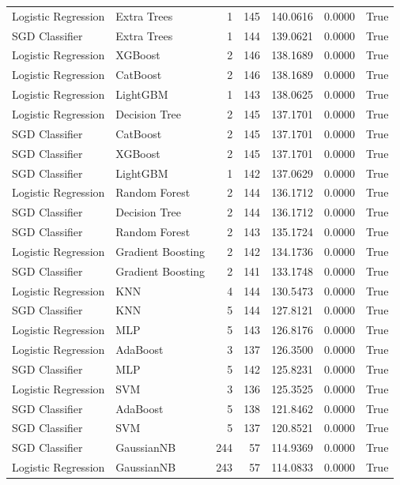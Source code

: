 \begin{table}
\begin{tabular}{llrrrrr}
Logistic Regression & Extra Trees & 1 & 145 & 140.0616 & 0.0000 & True \\
SGD Classifier & Extra Trees & 1 & 144 & 139.0621 & 0.0000 & True \\
Logistic Regression & XGBoost & 2 & 146 & 138.1689 & 0.0000 & True \\
Logistic Regression & CatBoost & 2 & 146 & 138.1689 & 0.0000 & True \\
Logistic Regression & LightGBM & 1 & 143 & 138.0625 & 0.0000 & True \\
Logistic Regression & Decision Tree & 2 & 145 & 137.1701 & 0.0000 & True \\
SGD Classifier & CatBoost & 2 & 145 & 137.1701 & 0.0000 & True \\
SGD Classifier & XGBoost & 2 & 145 & 137.1701 & 0.0000 & True \\
SGD Classifier & LightGBM & 1 & 142 & 137.0629 & 0.0000 & True \\
Logistic Regression & Random Forest & 2 & 144 & 136.1712 & 0.0000 & True \\
SGD Classifier & Decision Tree & 2 & 144 & 136.1712 & 0.0000 & True \\
SGD Classifier & Random Forest & 2 & 143 & 135.1724 & 0.0000 & True \\
Logistic Regression & Gradient Boosting & 2 & 142 & 134.1736 & 0.0000 & True \\
SGD Classifier & Gradient Boosting & 2 & 141 & 133.1748 & 0.0000 & True \\
Logistic Regression & KNN & 4 & 144 & 130.5473 & 0.0000 & True \\
SGD Classifier & KNN & 5 & 144 & 127.8121 & 0.0000 & True \\
Logistic Regression & MLP & 5 & 143 & 126.8176 & 0.0000 & True \\
Logistic Regression & AdaBoost & 3 & 137 & 126.3500 & 0.0000 & True \\
SGD Classifier & MLP & 5 & 142 & 125.8231 & 0.0000 & True \\
Logistic Regression & SVM & 3 & 136 & 125.3525 & 0.0000 & True \\
SGD Classifier & AdaBoost & 5 & 138 & 121.8462 & 0.0000 & True \\
SGD Classifier & SVM & 5 & 137 & 120.8521 & 0.0000 & True \\
SGD Classifier & GaussianNB & 244 & 57 & 114.9369 & 0.0000 & True \\
Logistic Regression & GaussianNB & 243 & 57 & 114.0833 & 0.0000 & True \\

\end{tabular}
\end{table}
